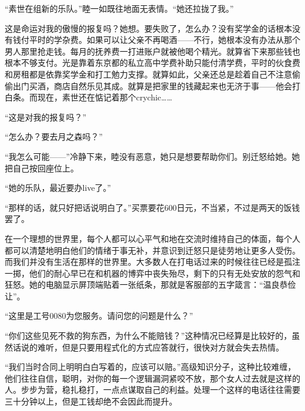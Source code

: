 \documentclass{article}
\begin{document}
\newpage



“素世在组新的乐队。”睦一如既往地面无表情。“她还拉拢了我。”



这是命运对我的傲慢的报复吗？她想。要失败了，怎么办？没有奖学金的话根本没有钱付平时的学杂费。如果可以让父亲不再喝酒——不行，她根本没有办法从那个男人那里抢走钱。每月的抚养费一打进账户就被他喝个精光。就算省下来那些钱也根本不够支付。光是靠着东京都的私立高中学费补助只能付清学费，平时的伙食费和房租都是依靠奖学金和打工勉力支撑。就算如此，父亲还总是趁着自己不注意偷偷出门买酒，商店自然乐见其成。就算是把家里的钱藏起来也无济于事——他会打白条。而现在，素世还在惦记着那个crychic……



“这是对我的报复吗？”



“怎么办？要去月之森吗？”



“我怎么可能——”冷静下来，睦没有恶意，她只是想要帮助你们。别迁怒给她。她把自己按回座位上。



“她的乐队，最近要办live了。”



“那样的话，就只好把话说明白了。”买票要花600日元，不当紧，不过是两天的饭钱罢了。



\newpage



在一个理想的世界里，每个人都可以心平气和地在交流时维持自己的体面，每个人都可以清楚地明白他们的情绪于事无补，并意识到迁怒只是徒劳地让更多人受伤。而我们并没有生活在那样的世界里。大多数人在打电话过来的时候往往已经是孤注一掷，他们的耐心早已在和机器的博弈中丧失殆尽，剩下的只有无处安放的怨气和狂怒。她的电脑显示屏顶端贴着一张纸条，那就是客服部的五字箴言：“温良恭俭让”。



“这里是工号0080为您服务。请问您的问题是什么？”



“你们这些见死不救的狗东西，为什么不能赔钱？”这种情况已经算是比较好的，虽然话说的难听，但是只要用程式化的方式应答就行，很快对方就会失去热情。



“我们当时合同上明明白白写着的，应该可以赔。”高级知识分子，这种比较难缠，他们往往自信，聪明，对你的每一个逻辑漏洞紧咬不放，那个女人过去就是这样的人。步步为营，稳扎稳打，一点点谋取自己的利益。处理一个这样的电话往往需要三十分钟以上，但是工钱却绝不会因此而提升。
\end{document}
